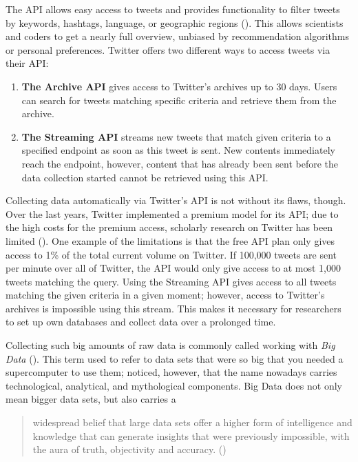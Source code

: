 The API allows easy access to tweets and provides functionality to filter tweets by keywords, hashtags, language, or geographic regions (\cite{bello2017detecting}). This allows scientists and coders to get a nearly full overview, unbiased by recommendation algorithms or personal preferences. Twitter offers two different ways to access tweets via their API:

\begin{enumerate}
    \item \textbf{The Archive API} gives access to Twitter's archives up to 30 days. Users can search for tweets matching specific criteria and retrieve them from the archive.
    \item \textbf{The Streaming API} streams new tweets that match given criteria to a specified endpoint as soon as this tweet is sent. New contents immediately reach the endpoint, however, content that has already been sent before the data collection started cannot be retrieved using this API.
\end{enumerate}

Collecting data automatically via Twitter's API is not without its flaws, though. Over the last years, Twitter implemented a premium model for its API; due to the high costs for the premium access, scholarly research on Twitter has been limited (\cite{brunsTwitterDataWhat2014}). One example of the limitations is that the free API plan only gives access to 1\% of the total current volume on Twitter. If 100,000 tweets are sent per minute over all of Twitter, the API would only give access to at most 1,000 tweets matching the query. Using the Streaming API gives access to all tweets matching the given criteria in a given moment; however, access to Twitter's archives is impossible using this stream. This makes it necessary for researchers to set up own databases and collect data over a prolonged time.

Collecting such big amounts of raw data is commonly called working with \emph{Big Data} (\cite{crawfordCriticalQuestionsBig2012}). This term used to refer to data sets that were so big that you needed a supercomputer to use them; \citeauthor{crawfordCriticalQuestionsBig2012} noticed, however, that the name nowadays carries technological, analytical, and mythological components. Big Data does not only mean bigger data sets, but also carries a 

\begin{quote}
    widespread belief that large data sets offer a higher form of intelligence and knowledge that can generate insights that were previously impossible, with the aura of truth, objectivity and accuracy. (\cite[3]{crawfordCriticalQuestionsBig2012})
\end{quote}

